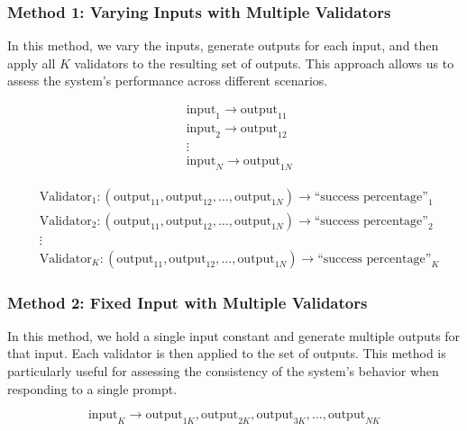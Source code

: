 \documentclass{article}
\begin{document}
\subsubsection{Method 1: Varying Inputs with Multiple Validators}

In this method, we vary the inputs, generate outputs for each input, and then apply all \( K \) validators to the resulting set of outputs. This approach allows us to assess the system's performance across different scenarios.

\begin{equation*}
\begin{aligned}
&\text{input}_1 \rightarrow \text{output}_{11} \\
&\text{input}_2 \rightarrow \text{output}_{12} \\
&\vdots \\
&\text{input}_N \rightarrow \text{output}_{1N}
\end{aligned}
\end{equation*}

\begin{equation*}
\begin{aligned}
&\text{Validator}_1: (\text{output}_{11}, \text{output}_{12}, \ldots, \text{output}_{1N}) \rightarrow \text{``success percentage''}_1 \\
&\text{Validator}_2: (\text{output}_{11}, \text{output}_{12}, \ldots, \text{output}_{1N}) \rightarrow \text{``success percentage''}_2 \\
&\vdots \\
&\text{Validator}_K: (\text{output}_{11}, \text{output}_{12}, \ldots, \text{output}_{1N}) \rightarrow \text{``success percentage''}_K
\end{aligned}
\end{equation*}

\subsubsection{Method 2: Fixed Input with Multiple Validators}

In this method, we hold a single input constant and generate multiple outputs for that input. Each validator is then applied to the set of outputs. This method is particularly useful for assessing the consistency of the system’s behavior when responding to a single prompt.

\begin{equation*}
\text{input}_K \rightarrow \text{output}_{1K}, \text{output}_{2K}, \text{output}_{3K}, \ldots, \text{output}_{NK}
\end{equation*}
\end{document}
